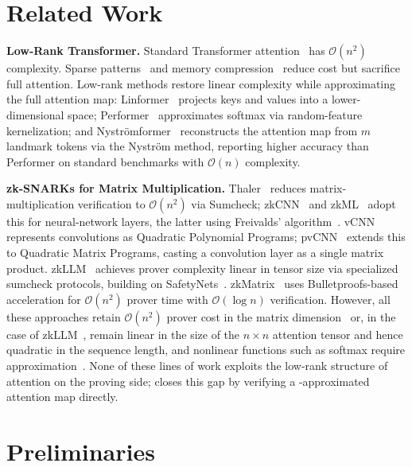 \documentclass[runningheads]{llncs}
\begin{document}
\section{Related Work}\label{sec:related}

\textbf{Low-Rank Transformer.}
Standard Transformer attention~\cite{OriginalTransformer} has $\mathcal{O}(n^2)$ complexity. Sparse patterns~\cite{SparseTransformer,Longformer} and memory compression~\cite{CompressiveTransformer} reduce cost but sacrifice full attention. Low-rank methods restore linear complexity while approximating the full attention map: Linformer~\cite{Linformer} projects keys and values into a lower-dimensional space; Performer~\cite{Performer} approximates softmax via random-feature kernelization; and Nystr\"omformer~\cite{Nystromformer} reconstructs the attention map from $m$ landmark tokens via the Nystr\"om method, reporting higher accuracy than Performer on standard benchmarks with $\mathcal{O}(n)$ complexity.

\textbf{zk-SNARKs for Matrix Multiplication.}
Thaler~\cite{Thaler} reduces matrix-multiplication verification to $\mathcal{O}(n^2)$ via Sumcheck; zkCNN~\cite{zkCNN} and zkML~\cite{zkML} adopt this for neural-network layers, the latter using Freivalds' algorithm~\cite{Freivalds}. vCNN~\cite{vCNN} represents convolutions as Quadratic Polynomial Programs; pvCNN~\cite{pvCNN} extends this to Quadratic Matrix Programs, casting a convolution layer as a single matrix product. zkLLM~\cite{zkLLM} achieves prover complexity linear in tensor size via specialized sumcheck protocols, building on SafetyNets~\cite{SafetyNets}. zkMatrix~\cite{zkMatrix} uses Bulletproofs-based acceleration for $\mathcal{O}(n^2)$ prover time with $\mathcal{O}(\log n)$ verification. However, all these approaches retain $\mathcal{O}(n^2)$ prover cost in the matrix dimension~\cite{Thaler,zkCNN,vCNN,pvCNN,zkML,zkMatrix} or, in the case of zkLLM~\cite{zkLLM}, remain linear in the size of the $n \times n$ attention tensor and hence quadratic in the sequence length, and nonlinear functions such as softmax require approximation~\cite{zkVC}. None of these lines of work exploits the low-rank structure of attention on the proving side; \name closes this gap by verifying a \nystrom-approximated attention map directly.

\section{Preliminaries}
\label{sec:preliminaries}
\end{document}
